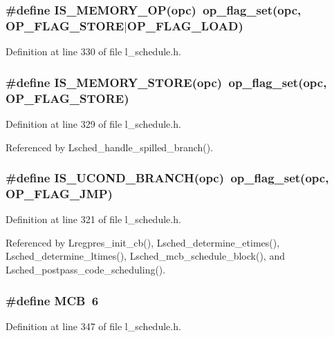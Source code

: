 \subsubsection{\setlength{\rightskip}{0pt plus 5cm}\#define IS\_\-MEMORY\_\-OP(opc)~op\_\-flag\_\-set(opc, OP\_\-FLAG\_\-STORE$|$OP\_\-FLAG\_\-LOAD)}\label{l__schedule_8h_e325b4d8ae3b1a1e227b6a73e14a4d78}




Definition at line 330 of file l\_\-schedule.h.
\subsubsection{\setlength{\rightskip}{0pt plus 5cm}\#define IS\_\-MEMORY\_\-STORE(opc)~op\_\-flag\_\-set(opc, OP\_\-FLAG\_\-STORE)}\label{l__schedule_8h_dfc68ee0cdc9005816ee7cd829f9a89e}




Definition at line 329 of file l\_\-schedule.h.

Referenced by Lsched\_\-handle\_\-spilled\_\-branch().
\subsubsection{\setlength{\rightskip}{0pt plus 5cm}\#define IS\_\-UCOND\_\-BRANCH(opc)~op\_\-flag\_\-set(opc, OP\_\-FLAG\_\-JMP)}\label{l__schedule_8h_3823d8a6013674a00b7cf154ae2788d2}




Definition at line 321 of file l\_\-schedule.h.

Referenced by Lregpres\_\-init\_\-cb(), Lsched\_\-determine\_\-etimes(), Lsched\_\-determine\_\-ltimes(), Lsched\_\-mcb\_\-schedule\_\-block(), and Lsched\_\-postpass\_\-code\_\-scheduling().
\subsubsection{\setlength{\rightskip}{0pt plus 5cm}\#define MCB~6}\label{l__schedule_8h_a09c29e7b5e67d47ef12162e89405449}




Definition at line 347 of file l\_\-schedule.h.

